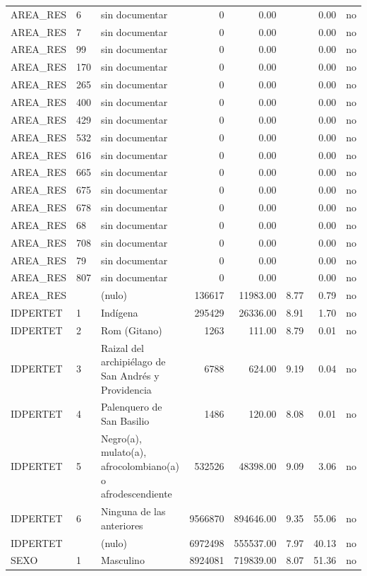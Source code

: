 \begin{tabular}{lllrrrrr}
AREA\_RES & 6 & sin documentar & 0 & 0.00 &  & 0.00 & no \\
AREA\_RES & 7 & sin documentar & 0 & 0.00 &  & 0.00 & no \\
AREA\_RES & 99 & sin documentar & 0 & 0.00 &  & 0.00 & no \\
AREA\_RES & 170 & sin documentar & 0 & 0.00 &  & 0.00 & no \\
AREA\_RES & 265 & sin documentar & 0 & 0.00 &  & 0.00 & no \\
AREA\_RES & 400 & sin documentar & 0 & 0.00 &  & 0.00 & no \\
AREA\_RES & 429 & sin documentar & 0 & 0.00 &  & 0.00 & no \\
AREA\_RES & 532 & sin documentar & 0 & 0.00 &  & 0.00 & no \\
AREA\_RES & 616 & sin documentar & 0 & 0.00 &  & 0.00 & no \\
AREA\_RES & 665 & sin documentar & 0 & 0.00 &  & 0.00 & no \\
AREA\_RES & 675 & sin documentar & 0 & 0.00 &  & 0.00 & no \\
AREA\_RES & 678 & sin documentar & 0 & 0.00 &  & 0.00 & no \\
AREA\_RES & 68 & sin documentar & 0 & 0.00 &  & 0.00 & no \\
AREA\_RES & 708 & sin documentar & 0 & 0.00 &  & 0.00 & no \\
AREA\_RES & 79 & sin documentar & 0 & 0.00 &  & 0.00 & no \\
AREA\_RES & 807 & sin documentar & 0 & 0.00 &  & 0.00 & no \\
AREA\_RES &  & (nulo) & 136617 & 11983.00 & 8.77 & 0.79 & no \\
IDPERTET & 1 & Indígena & 295429 & 26336.00 & 8.91 & 1.70 & no \\
IDPERTET & 2 & Rom (Gitano) & 1263 & 111.00 & 8.79 & 0.01 & no \\
IDPERTET & 3 & Raizal del archipiélago de San Andrés y Providencia & 6788 & 624.00 & 9.19 & 0.04 & no \\
IDPERTET & 4 & Palenquero de San Basilio & 1486 & 120.00 & 8.08 & 0.01 & no \\
IDPERTET & 5 & Negro(a), mulato(a), afrocolombiano(a) o afrodescendiente & 532526 & 48398.00 & 9.09 & 3.06 & no \\
IDPERTET & 6 & Ninguna de las anteriores & 9566870 & 894646.00 & 9.35 & 55.06 & no \\
IDPERTET &  & (nulo) & 6972498 & 555537.00 & 7.97 & 40.13 & no \\
SEXO & 1 & Masculino & 8924081 & 719839.00 & 8.07 & 51.36 & no \\

\end{tabular}
